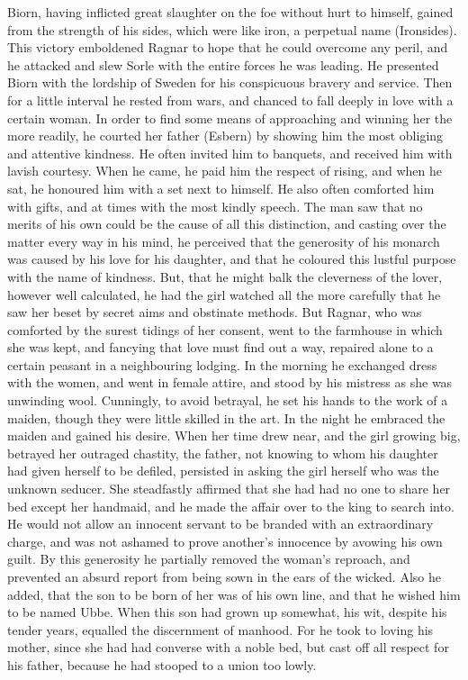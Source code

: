 \documentclass[10pt,a4paper]{report}
\begin{document}
Biorn, having inflicted great slaughter on the foe without hurt to himself, gained from the strength of his sides, which were like iron, a perpetual name (Ironsides). This victory emboldened Ragnar to hope that he could overcome any peril, and he attacked and slew Sorle with the entire forces he was leading. He presented Biorn with the lordship of Sweden for his conspicuous bravery and service. Then for a little interval he rested from wars, and chanced to fall deeply in love with a certain woman. In order to find some means of approaching and winning her the more readily, he courted her father (Esbern) by showing him the most obliging and attentive kindness. He often invited him to banquets, and received him with lavish courtesy. When he came, he paid him the respect of rising, and when he sat, he honoured him with a set next to himself. He also often comforted him with gifts, and at times with the most kindly speech. The man saw that no merits of his own could be the cause of all this distinction, and casting over the matter every way in his mind, he perceived that the generosity of his monarch was caused by his love for his daughter, and that he coloured this lustful purpose with the name of kindness. But, that he might balk the cleverness of the lover, however well calculated, he had the girl watched all the more carefully that he saw her beset by secret aims and obstinate methods. But Ragnar, who was comforted by the surest tidings of her consent, went to the farmhouse in which she was kept, and fancying that love must find out a way, repaired alone to a certain peasant in a neighbouring lodging. In the morning he exchanged dress with the women, and went in female attire, and stood by his mistress as she was unwinding wool. Cunningly, to avoid betrayal, he set his hands to the work of a maiden, though they were little skilled in the art. In the night he embraced the maiden and gained his desire. When her time drew near, and the girl growing big, betrayed her outraged chastity, the father, not knowing to whom his daughter had given herself to be defiled, persisted in asking the girl herself who was the unknown seducer. She steadfastly affirmed that she had had no one to share her bed except her handmaid, and he made the affair over to the king to search into. He would not allow an innocent servant to be branded with an extraordinary charge, and was not ashamed to prove another's innocence by avowing his own guilt. By this generosity he partially removed the woman's reproach, and prevented an absurd report from being sown in the ears of the wicked. Also he added, that the son to be born of her was of his own line, and that he wished him to be named Ubbe. When this son had grown up somewhat, his wit, despite his tender years, equalled the discernment of manhood. For he took to loving his mother, since she had had converse with a noble bed, but cast off all respect for his father, because he had stooped to a union too lowly.\\
\end{document}

